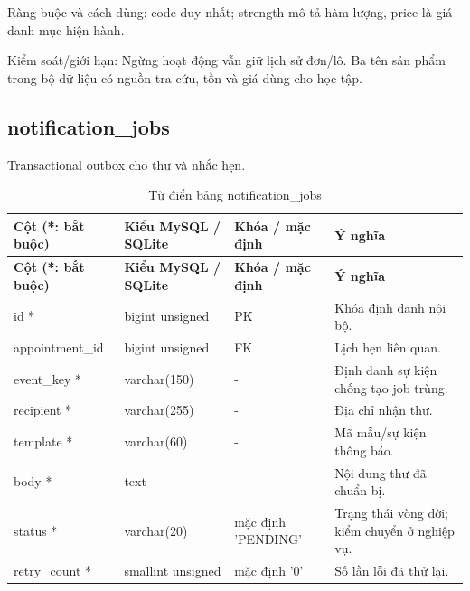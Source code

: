 Ràng buộc và cách dùng:\allowbreak{} code duy nhất; strength mô tả hàm lượng, price là giá danh mục hiện hành.\allowbreak{}

Kiểm soát/\allowbreak{}giới hạn:\allowbreak{} Ngừng hoạt động vẫn giữ lịch sử đơn/\allowbreak{}lô.\allowbreak{} Ba tên sản phẩm trong bộ dữ liệu có nguồn tra cứu, tồn và giá dùng cho học tập.\allowbreak{}

\clearpage

\subsection{notification\_\allowbreak{}jobs}
Transactional outbox cho thư và nhắc hẹn.\allowbreak{}


{\fontsize{10}{12}\selectfont\setlength{\tabcolsep}{3pt}\renewcommand{\arraystretch}{1.12}
\begin{longtable}{@{}L{\textwidth-4.86pt\relax} L{\textwidth-3.96pt\relax} L{\textwidth-2.88pt\relax} L{\textwidth-6.3pt\relax}@{}}
\caption{Từ điển bảng notification\_\allowbreak{}jobs}\\
\toprule
\textbf{Cột (*:\allowbreak{} bắt buộc)} & \textbf{Kiểu My\allowbreak{}SQL /\allowbreak{} SQLite} & \textbf{Khóa /\allowbreak{} mặc định} & \textbf{Ý nghĩa}\\\midrule
\endfirsthead
\toprule
\textbf{Cột (*:\allowbreak{} bắt buộc)} & \textbf{Kiểu My\allowbreak{}SQL /\allowbreak{} SQLite} & \textbf{Khóa /\allowbreak{} mặc định} & \textbf{Ý nghĩa}\\\midrule
\endhead
\bottomrule\endlastfoot
id * & bigint unsigned & PK & Khóa định danh nội bộ.\allowbreak{}\\[1pt]
appointment\_\allowbreak{}id & bigint unsigned & FK & Lịch hẹn liên quan.\allowbreak{}\\[1pt]
event\_\allowbreak{}key * & varchar(150) & - & Định danh sự kiện chống tạo job trùng.\allowbreak{}\\[1pt]
recipient * & varchar(255) & - & Địa chỉ nhận thư.\allowbreak{}\\[1pt]
template * & varchar(60) & - & Mã mẫu/\allowbreak{}sự kiện thông báo.\allowbreak{}\\[1pt]
body * & text & - & Nội dung thư đã chuẩn bị.\allowbreak{}\\[1pt]
status * & varchar(20) & mặc định 'PENDING' & Trạng thái vòng đời; kiểm chuyển ở nghiệp vụ.\allowbreak{}\\[1pt]
retry\_\allowbreak{}count * & smallint unsigned & mặc định '0' & Số lần lỗi đã thử lại.\allowbreak{}\\[1pt]

\end{longtable}}
